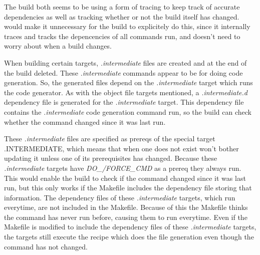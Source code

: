 The build both seems to be using a form of tracing to keep track of accurate dependencies as well as tracking whether or not the build itself has changed.  \Rattle would make it unnecessary for the build to explicitely do this, since it internally traces and tracks the depencencies of all commands run, and doesn't need to worry about when a build changes.





When building certain targets, \emph{.intermediate} files are created and at the end of the build deleted.  These \emph{.intermediate} commands appear to be for doing code generation.  So, the generated files depend on the \emph{.intermediate} target which runs the code generator.  As with the object file targets mentioned, a \emph{.intermediate.d} dependency file is generated for the \emph{.intermediate} target.  This dependency file contains the \emph{.intermediate} code generation command run, so the build can check whether the command changed since it was last run.

These \emph{.intermediate} files are specified as prereqs of the special \Make target {.INTERMEDIATE}, which means that when one does not exist \Make won't bother updating it unless one of its prerequisites has changed.  Because these \emph{.intermediate} targets have \emph{DO\_/FORCE\_CMD} as a prereq they always run.  This would enable the build to check if the command changed since it was last run, but this only works if the Makefile includes the dependency file storing that information.  The dependency files of these \emph{.intermediate} targets, which run everytime, are not included in the Makefile.  Because of this the Makefile thinks the command has never run before, causing them to run everytime.  Even if the Makefile is modified to include the dependency files of these \emph{.intermediate} targets, the targets still execute the recipe which does the file generation even though the command has not changed. %

